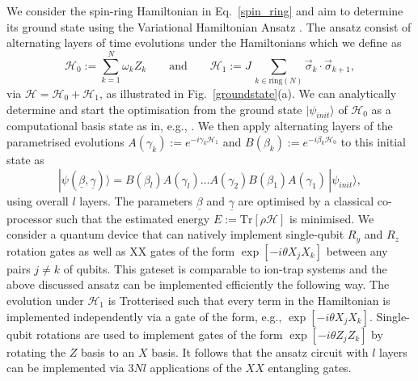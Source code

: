 \documentclass[aps,prx,showpacs,twocolumn,reprint]{revtex4-2}
\newcommand{\tr}{\mathrm{Tr}}
\begin{document}
{We consider the spin-ring Hamiltonian in Eq.~\ref{spin_ring} and aim to determine its ground state
using the Variational Hamiltonian Ansatz \cite{cerezo2020variationalreview,endo2020hybrid,bharti2021noisy,farhi2014quantum,pagano2020quantum,arute2020quantum,babbush2018low,wecker2015progress,cade2020strategies,PRXQuantum.1.020319}. The ansatz consist of alternating layers of time
evolutions under the Hamiltonians which we define as
\begin{equation*}
	\mathcal{H}_{0} :=  \sum_{k = 1 }^N \omega_k Z_k
	\quad \quad \text{and}  \quad \quad 
	\mathcal{H}_{1} := J \, \sum_{k \in \text{ring}(N)}  \vec{\sigma}_k \cdot \vec{\sigma}_{k+1},
\end{equation*}
via $\mathcal{H} = \mathcal{H}_0 + \mathcal{H}_1$,
as illustrated in Fig.~\ref{groundstate}(a).
We can analytically determine and start the optimisation from the ground state $|\psi_{init}\rangle$ of $\mathcal{H}_{0}$
as a computational basis state as in, e.g.,  \cite{pagano2020quantum}. We then apply alternating layers
of the parametrised evolutions $A(\gamma_k):= e^{-i \gamma_k \mathcal{H}_1 }$ and $B(\beta_k):=  e^{-i \beta_k \mathcal{H}_0 }$
to this initial state as
\begin{equation*}
	|\psi(\underline{\beta}, \underline{\gamma}) \rangle =  
	 B(\beta_l)  A(\gamma_l)  \dots A(\gamma_2) B(\beta_1)  A(\gamma_1)  \,	|\psi_{init}\rangle,
\end{equation*}
using overall $l$ layers. The parameters $\underline{\beta}$ and $\underline{\gamma}$ are optimised by a
classical co-processor such that the estimated energy $E:=\tr[\rho \mathcal{H}]$ is minimised. 
We consider a quantum device that can natively implement single-qubit $R_y$ and $R_z$ rotation
gates as well as XX gates of the form $\exp[-i\theta X_j X_k]$ between any pairs $j \neq k$ of qubits.
This gateset is comparable to ion-trap systems \cite{pogorelov2021compact} and the above discussed
ansatz can be implemented efficiently the following way. The evolution under $\mathcal{H}_1$ is Trotterised
such that every term in the Hamiltonian is implemented independently via a gate of the form, e.g., 
$\exp[-i\theta X_j X_k]$. Single-qubit rotations are used to implement gates of the form 
$\exp[-i\theta Z_j Z_k]$ by rotating the $Z$ basis to an $X$ basis.
It follows that the ansatz circuit with $l$ layers can be implemented via $3Nl$
applications of the $XX$ entangling gates.




}
\end{document}
